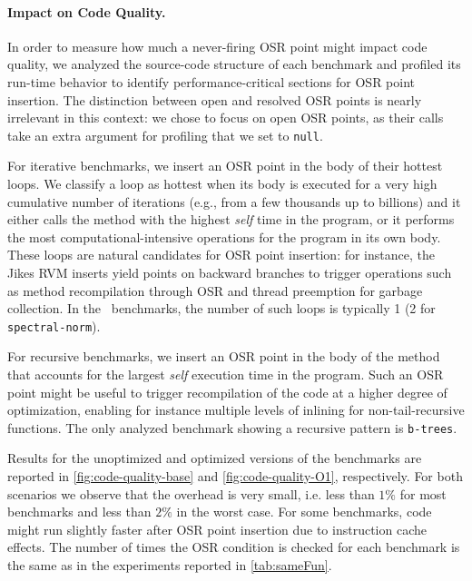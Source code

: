 \paragraph{Impact on Code Quality.}
In order to measure how much a never-firing OSR point might impact code quality, we analyzed the source-code structure of each benchmark and profiled its run-time behavior to identify performance-critical sections for OSR point insertion. The distinction between open and resolved OSR points is nearly irrelevant in this context: we chose to focus on open OSR points, as their calls take an extra argument for profiling that we set to {\tt null}.

For iterative benchmarks, we insert an OSR point in the body of their hottest loops. We classify a loop as hottest when its body is executed for a very high cumulative number of iterations (e.g., from a few thousands up to billions) and it either calls the method with the highest {\em self} time in the program, or it performs the most computational-intensive operations for the program in its own body. These loops are natural candidates for OSR point insertion: for instance, the Jikes RVM inserts yield points on backward branches to trigger operations such as method recompilation through OSR and thread preemption for garbage collection. In the \shootout\ benchmarks, the number of such loops is typically 1 (2 for {\tt spectral-norm}).

For recursive benchmarks, we insert an OSR point in the body of the method that accounts for the largest {\em self} execution time in the program. Such an OSR point might be useful to trigger recompilation of the code at a higher degree of optimization, enabling for instance multiple levels of inlining for non-tail-recursive functions. The only analyzed benchmark showing a recursive pattern is {\tt b-trees}.


Results for the unoptimized and optimized versions of the benchmarks are reported in \myfigure\ref{fig:code-quality-base} and \myfigure\ref{fig:code-quality-O1}, respectively. For both scenarios we observe that the overhead is very small, i.e. less than $1\%$ for most benchmarks and less than $2\%$ in the worst case. For some benchmarks, code might run slightly faster after OSR point insertion due to instruction cache effects.
The number of times the OSR condition is checked for each benchmark is the same as in the experiments reported in \mytable\ref{tab:sameFun}.
  
